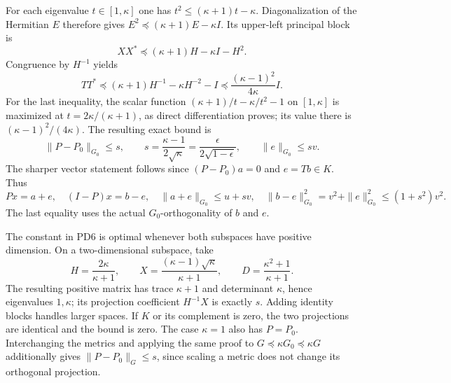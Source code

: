 For each eigenvalue $t\in[1,\kappa]$ one has
$t^2\le(\kappa+1)t-\kappa$.  Diagonalization of the Hermitian
$E$ therefore gives
$E^2\preceq(\kappa+1)E-\kappa I$.  Its upper-left principal block is
\[
 XX^*\preceq(\kappa+1)H-\kappa I-H^2.
\]
Congruence by $H^{-1}$ yields
\[
 TT^*\preceq(\kappa+1)H^{-1}-\kappa H^{-2}-I
           \preceq\frac{(\kappa-1)^2}{4\kappa}I.                 \tag{PD5}
\]
For the last inequality, the scalar function
$(\kappa+1)/t-\kappa/t^2-1$ on $[1,\kappa]$ is maximized at
$t=2\kappa/(\kappa+1)$, as direct differentiation proves; its
value there is $(\kappa-1)^2/(4\kappa)$.  The resulting exact bound is
\[
 \boxed{\|P-P_0\|_{G_0}\le s,
 \qquad s=\frac{\kappa-1}{2\sqrt\kappa}
          =\frac{\epsilon}{2\sqrt{1-\epsilon}},\qquad
 \|e\|_{G_0}\le s v.}                                           \tag{PD6}
\]
The sharper vector statement follows since $(P-P_0)a=0$ and
$e=Tb\in K$.  Thus
\[
 Px=a+e,\quad(I-P)x=b-e,\quad
 \|a+e\|_{G_0}\le u+sv,\quad
 \|b-e\|_{G_0}^2=v^2+\|e\|_{G_0}^2\le(1+s^2)v^2.              \tag{PD7}
\]
The last equality uses the actual $G_0$-orthogonality of $b$ and $e$.

The constant in PD6 is optimal whenever both subspaces have positive
dimension.  On a two-dimensional subspace, take
\[
 H=\frac{2\kappa}{\kappa+1},\qquad
 X=\frac{(\kappa-1)\sqrt\kappa}{\kappa+1},\qquad
 D=\frac{\kappa^2+1}{\kappa+1}.                                  \tag{PD8}
\]
The resulting positive matrix has trace $\kappa+1$ and determinant
$\kappa$, hence eigenvalues $1,\kappa$; its projection coefficient
$H^{-1}X$ is exactly $s$.  Adding identity blocks handles larger
spaces.  If $K$ or its complement is zero, the two projections
are identical and the bound is zero.  The case $\kappa=1$ also
has $P=P_0$.  Interchanging the metrics and applying the same proof
to $G\preceq\kappa G_0\preceq\kappa G$ additionally gives
$\|P-P_0\|_G\le s$, since scaling a metric does not change its
orthogonal projection.

